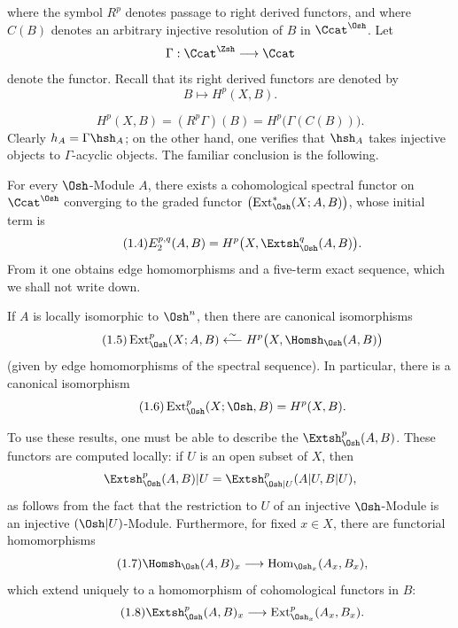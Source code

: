where the symbol $R^{p}$ denotes passage to right derived functors, and where
$C(B)$ denotes an arbitrary injective resolution of $B$ in $\Ccat^{\Osh}$. Let
\[
  \Gamma:\Ccat^{\Zsh}\longrightarrow\Ccat
\]
denote the  functor. Recall that its right derived functors are
denoted by
\[
  B\longmapsto H^{p}(X,B).
\]

\begin{equation}\tag{1.3}
  H^{p}(X,B)=(R^{p}\Gamma)(B)=H^{p}\bigl(\Gamma(C(B))\bigr).
\end{equation}
Clearly $h_A=\Gamma\hsh_A$; on the other hand, one verifies that $\hsh_A$
takes injective objects to $\Gamma$-acyclic objects. The familiar conclusion is
the following.

 For every $\Osh$-Module $A$, there exists a
cohomological spectral functor on $\Ccat^{\Osh}$ converging to the graded functor
$\bigl(\operatorname{Ext}_{\Osh}^{*}(X;A,B)\bigr)$, whose initial term is
\begin{equation}\tag{1.4}
  E_{2}^{p,q}(A,B)=H^{p}\bigl(X,\Extsh_{\Osh}^{q}(A,B)\bigr).
\end{equation}
From it one obtains edge homomorphisms and a five-term exact sequence, which we
shall not write down.

 If $A$ is locally isomorphic to $\Osh^{n}$, then there are
canonical isomorphisms
\begin{equation}\tag{1.5}
  \operatorname{Ext}_{\Osh}^{p}(X;A,B)
  \overset{\sim}{\longleftarrow}
  H^{p}\bigl(X,\Homsh_{\Osh}(A,B)\bigr)
\end{equation}
(given by edge homomorphisms of the spectral sequence). In particular, there is
a canonical isomorphism
\begin{equation}\tag{1.6}
  \operatorname{Ext}_{\Osh}^{p}(X;\Osh,B)=H^{p}(X,B).
\end{equation}

To use these results, one must be able to describe the
$\Extsh_{\Osh}^{p}(A,B)$. These functors are computed locally: if $U$ is an open
subset of $X$, then
\[
  \Extsh_{\Osh}^{p}(A,B)|U
  =\Extsh_{\Osh|U}^{p}(A|U,B|U),
\]
as follows from the fact that the restriction to $U$ of an injective
$\Osh$-Module is an injective $(\Osh|U)$-Module. Furthermore, for fixed
$x\in X$, there are functorial homomorphisms
\begin{equation}\tag{1.7}
  \Homsh_{\Osh}(A,B)_x
  \longrightarrow
  \operatorname{Hom}_{\Osh_x}(A_x,B_x),
\end{equation}
which extend uniquely to a homomorphism of cohomological functors in $B$:
\begin{equation}\tag{1.8}
  \Extsh_{\Osh}^{p}(A,B)_x
  \longrightarrow
  \operatorname{Ext}_{\Osh_x}^{p}(A_x,B_x).
\end{equation}


